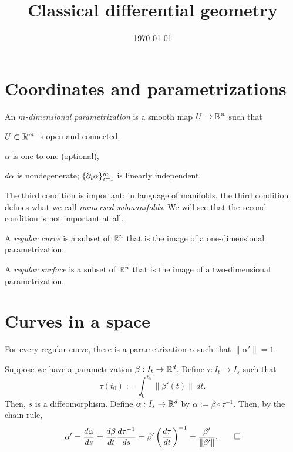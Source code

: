 \documentclass{../exp}
\title{Classical differential geometry}
\date{\today}
\def\a{\alpha}
\begin{document}
\maketitle

\section{Coordinates and parametrizations}
\begin{defn}
An \emph{$m$-dimensional parametrization} is a smooth map $U\to\R^n$ such that
\begin{cond}
\item $U\subset\mathbb{R}^m$ is open and connected,
\item $\a$ is one-to-one (optional),
\item $d\a$ is nondegenerate; $\{\pd_i\a\}_{i=1}^m$ is linearly independent.
\end{cond}
\end{defn}
The third condition is important; in language of manifolds, the third condition defines what we call \emph{immersed submanifolds}.
We will see that the second condition is not important at all.

\begin{defn}
A \emph{regular curve} is a subset of $\mathbb{R}^n$ that is the image of a one-dimensional parametrization.
\end{defn}
\begin{defn}
A \emph{regular surface} is a subset of $\mathbb{R}^n$ that is the image of a two-dimensional parametrization.
\end{defn}





\section{Curves in a space}
\begin{thm}
For every regular curve, there is a parametrization $\a$ such that $\|\a'\|=1$.
\end{thm}
\begin{pf}
Suppose we have a parametrization $\beta:I_t\to\R^d$.
Define $\tau:I_t\to I_s$ such that
\[\tau(t_0):=\int_0^{t_0}\|\beta'(t)\|\,dt.\]
Then, $s$ is a diffeomorphism.
Define $\a:I_s\to\R^d$ by $\a:=\beta\circ\tau^{-1}$.
Then, by the chain rule,
\[\a'=\dd{\a}{s}=\dd{\beta}{t}\dd{\tau^{-1}}{s}=\beta'\left(\dd{\tau}{t}\right)^{-1}=\frac{\beta'}{\|\beta'\|}.\qedhere\]
\end{pf}
\end{document}

